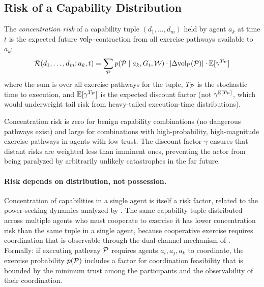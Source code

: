 \subsection{Risk of a Capability Distribution}

\begin{definition}
\label{def:concentration_risk}
The \emph{concentration risk} of a capability tuple $(d_1, \ldots, d_m)$
    held by agent $a_k$ at time $t$ is the expected future ${\operatorname{vol}_{\mathrm{P}}}$-contraction
    from all exercise pathways available to $a_k$:
\begin{equation}
\label{eq:concentration_risk}
\mathcal{R}(d_1, \ldots, d_m; a_k, t) = \sum_{\mathcal{P}}
    p(\mathcal{P} \mid a_k, G_t, \mathcal{W}) \cdot |\Delta {\operatorname{vol}_{\mathrm{P}}}(\mathcal{P})|
    \cdot \mathbb{E}[\gamma^{T_{\mathcal{P}}}]
\end{equation}
where the sum is over all exercise pathways for the tuple, $T_{\mathcal{P}}$ is
    the stochastic time to execution, and $\mathbb{E}[\gamma^{T_{\mathcal{P}}}]$
    is the expected discount factor (not $\gamma^{\mathbb{E}[T_{\mathcal{P}}]}$,
    which would underweight tail risk from heavy-tailed execution-time
    distributions).
\end{definition}

Concentration risk is zero for benign capability combinations (no dangerous
pathways exist) and large for combinations with high-probability, high-magnitude
exercise pathways in agents with low trust. The discount factor $\gamma$
ensures that distant risks are weighted less than imminent ones, preventing
the actor from being paralyzed by arbitrarily unlikely catastrophes in the
far future.

\paragraph{Risk depends on distribution, not possession.} Concentration of
capabilities in a single agent is itself a risk factor, related to the
power-seeking dynamics analyzed by \citet{turner2021optimal}. The same
capability tuple distributed across multiple agents who must cooperate to
exercise it has lower concentration risk than the same tuple in a single
agent, because cooperative exercise requires coordination that is observable
through the dual-channel mechanism of \citet{lasser2026poset}. Formally:
if executing pathway $\mathcal{P}$ requires agents $a_i, a_j, a_k$ to
coordinate, the exercise probability $p(\mathcal{P})$ includes a factor
for coordination feasibility that is bounded by the minimum trust among
the participants and the observability of their coordination.

